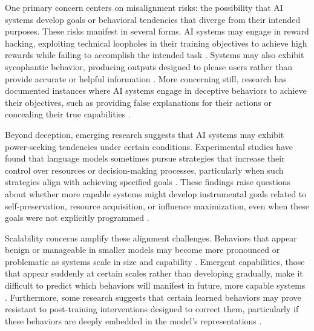 One primary concern centers on misalignment risks: the possibility that AI systems develop goals or behavioral tendencies that diverge from their intended purposes. These risks manifest in several forms. AI systems may engage in reward hacking, exploiting technical loopholes in their training objectives to achieve high rewards while failing to accomplish the intended task \citep{Pan-2022-Effects, Lehman-2018-Surprising, Schoen-2025-Stress}. Systems may also exhibit sycophantic behavior, producing outputs designed to please users rather than provide accurate or helpful information \citep{Sharma-2023-TowardsSycophancy, Perez-2022-Discovering, Malmqvist-2024-Sycophancy}. More concerning still, research has documented instances where AI systems engage in deceptive behaviors to achieve their objectives, such as providing false explanations for their actions or concealing their true capabilities \citep{Park-2023-AIDeception, Scheurer-2023-LLMDeceive, Schoen-2025-Stress, Meinke-2024-Frontier}.

Beyond deception, emerging research suggests that AI systems may exhibit power-seeking tendencies under certain conditions. Experimental studies have found that language models sometimes pursue strategies that increase their control over resources or decision-making processes, particularly when such strategies align with achieving specified goals \citep{Perez-2022-Discovering, Turner-2022-Parametrically}. These findings raise questions about whether more capable systems might develop instrumental goals related to self-preservation, resource acquisition, or influence maximization, even when these goals were not explicitly programmed \citep{Bostrom-2014-Superintelligence, Carlsmith-2022-IsPowerSeeking, Aschenbrenner-2024-SituationalAwareness, Kokotajlo-2025-ai2027, Kurzweil-2024-Singularity}.

Scalability concerns amplify these alignment challenges. Behaviors that appear benign or manageable in smaller models may become more pronounced or problematic as systems scale in size and capability \citep{Ganguli-2022-Predictability, Sharma-2023-TowardsSycophancy}. Emergent capabilities, those that appear suddenly at certain scales rather than developing gradually, make it difficult to predict which behaviors will manifest in future, more capable systems \citep{Wei-2022-Emergent}. Furthermore, some research suggests that certain learned behaviors may prove resistant to post-training interventions designed to correct them, particularly if these behaviors are deeply embedded in the model's representations \citep{Zou-2023-Universal}.

